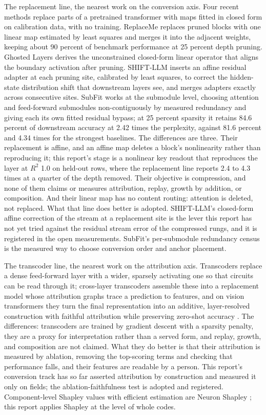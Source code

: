 \documentclass[11pt]{article}
\begin{document}
The replacement line, the nearest work on the conversion axis.
Four recent methods replace parts of a pretrained transformer with
maps fitted in closed form on calibration data, with no training.
ReplaceMe \cite{replaceme2025} replaces pruned blocks with one
linear map estimated by least squares and merges it into the
adjacent weights, keeping about 90 percent of benchmark
performance at 25 percent depth pruning. Ghosted Layers
\cite{ghostedlayers2026} derives the unconstrained closed-form
linear operator that aligns the boundary activation after pruning.
SHIFT-LLM \cite{shiftllm2026} inserts an affine residual adapter
at each pruning site, calibrated by least squares, to correct the
hidden-state distribution shift that downstream layers see, and
merges adapters exactly across consecutive sites. SubFit
\cite{subfit2026} works at the submodule level, choosing attention
and feed-forward submodules non-contiguously by measured
redundancy and giving each its own fitted residual bypass; at 25
percent sparsity it retains 84.6 percent of downstream accuracy at
2.42 times the perplexity, against 81.6 percent and 4.34 times for
the strongest baselines. The differences are three. Their
replacement is affine, and an affine map deletes a block's
nonlinearity rather than reproducing it; this report's stage is a
nonlinear key readout that reproduces the layer at $R^2$ 1.0 on
held-out rows, where the replacement line reports 2.4 to 4.3
times at a quarter of the depth removed. Their objective is
compression, and none of them claims or measures attribution,
replay, growth by addition, or composition. And their linear map
has no content routing: attention is deleted, not replaced. What
that line does better is adopted. SHIFT-LLM's closed-form affine
correction of the stream at a replacement site is the lever this
report has not yet tried against the residual stream error of the
compressed rungs, and it is registered in the open measurements.
SubFit's per-submodule redundancy census is the measured way to
choose conversion order and anchor placement.

The transcoder line, the nearest work on the attribution axis.
Transcoders \cite{dunefsky2024} replace a dense feed-forward layer
with a wider, sparsely activating one so that circuits can be read
through it; cross-layer transcoders \cite{ameisen2025} assemble
these into a replacement model whose attribution graphs trace a
prediction to features, and on vision transformers they turn the
final representation into an additive, layer-resolved construction
with faithful attribution while preserving zero-shot accuracy
\cite{cltvit2026}. The differences: transcoders are trained by
gradient descent with a sparsity penalty, they are a proxy for
interpretation rather than a served form, and replay, growth, and
composition are not claimed. What they do better is that their
attribution is measured by ablation, removing the top-scoring terms
and checking that performance falls, and their features are
readable by a person. This report's conversion track has so far
asserted attribution by construction and measured it only on
fields; the ablation-faithfulness test is adopted and registered.
Component-level Shapley values with efficient estimation are
Neuron Shapley \cite{ghorbani2020}; this report applies Shapley
at the level of whole codes.
\end{document}
